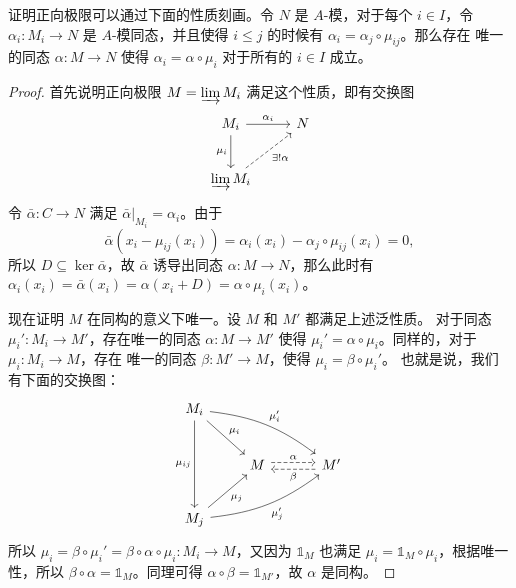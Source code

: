 \begin{problem}
  证明正向极限可以通过下面的性质刻画。令 $N$ 是 $A$-模，对于每个 $i\in I$，令 $\alpha_i:M_i\to N$
  是 $A$-模同态，并且使得 $i\leq j$ 的时候有 $\alpha_i=\alpha_j\circ\mu_{ij}$。那么存在
  唯一的同态 $\alpha:M\to N$ 使得 $\alpha_i=\alpha\circ\mu_i$ 对于所有的 $i\in I$ 成立。
\end{problem}
\begin{proof}
  首先说明正向极限 $M=\varinjlim M_i$ 满足这个性质，即有交换图
  \[
    \begin{tikzcd}[sep=2.4em]
      M_i\arrow[r,"\alpha_i"]\arrow[d,"\mu_i"'] & N \\
      \varinjlim M_i \arrow[ur,dashed,"\exists!\alpha"'] & 
    \end{tikzcd}  
  \]
  令 $\bar\alpha:C\to N$ 满足 $\bar\alpha|_{M_i}=\alpha_i$。由于
  \[
    \bar{\alpha}(x_i-\mu_{ij}(x_i))=\alpha_i(x_i)-\alpha_j\circ\mu_{ij}(x_i)=0,  
  \]
  所以 $D\subseteq\ker\bar\alpha$，故 $\bar\alpha$ 诱导出同态 $\alpha:M\to N$，那么此时有
  $\alpha_i(x_i)=\bar\alpha(x_i)=\alpha(x_i+D)=\alpha\circ\mu_i(x_i)$。

  现在证明 $M$ 在同构的意义下唯一。设 $M$ 和 $M'$ 都满足上述泛性质。
  对于同态 $\mu_i':M_i\to M'$，存在唯一的同态 $\alpha:M\to M'$
  使得 $\mu_i'=\alpha\circ\mu_i$。同样的，对于 $\mu_i:M_i\to M$，存在
  唯一的同态 $\beta:M'\to M$，使得 $\mu_i=\beta\circ\mu_i'$。
  也就是说，我们有下面的交换图：
  \[
    \begin{tikzcd}[sep=2.4em]
      M_i
      \arrow[dd,"\mu_{ij}"']
      \arrow[dr,"\mu_i"]
      \arrow[drr,bend left=15,"\mu_i'"]
      & &[.8em] \\
      &
      M
      \arrow[r,dashed,shift left,"\alpha"]
      &
      M' 
      \arrow[l,dashed,shift left,"\beta"]
      \\
      M_j
      \arrow[ur,"\mu_j"']
      \arrow[urr,bend right=15,"\mu_j'"']
      & & 
    \end{tikzcd}  
  \]
  所以 $\mu_i=\beta\circ\mu_i'=\beta\circ\alpha\circ\mu_i:M_i\to M$，又因为
  $\mathbb{1}_{M}$ 也满足 $\mu_i=\mathbb{1}_M\circ\mu_i$，根据唯一性，所以
  $\beta\circ\alpha=\mathbb{1}_M$。同理可得 $\alpha\circ\beta=\mathbb{1}_{M'}$，故
  $\alpha$ 是同构。
\end{proof}

